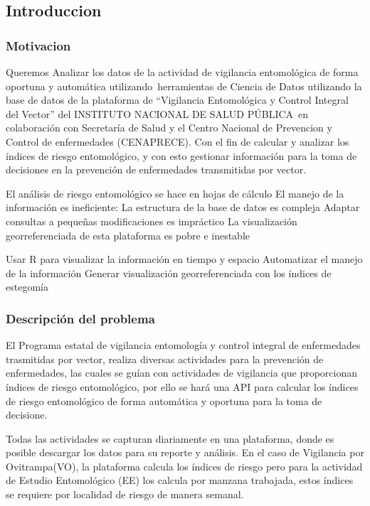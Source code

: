 \documentclass[
  letterpaper,
  DIV=11,
  numbers=noendperiod]{scrartcl}
\author{}
\date{}
\begin{document}
\subsection{Introduccion}\label{introduccion}

\subsubsection{Motivacion}\label{motivacion}

Queremos Analizar los datos de la actividad de vigilancia entomológica
de forma oportuna y automática utilizando~herramientas de Ciencia de
Datos utilizando la base de datos de la plataforma de ``Vigilancia
Entomológica y Control Integral del Vector'' del INSTITUTO NACIONAL DE
SALUD PÚBLICA~en colaboración con Secretaría de Salud y el Centro
Nacional de Prevencion y Control de enfermedades (CENAPRECE). Con el fin
de calcular y analizar los índices de riesgo entomológico, y con esto
gestionar información para la toma de decisiones en la prevención de
enfermedades transmitidas por vector.

El análisis de riesgo entomológico se hace en hojas de cálculo El manejo
de la información es ineficiente: La estructura de la base de datos es
compleja Adaptar consultas a pequeñas modificaciones es impráctico La
visualización georreferenciada de esta plataforma es pobre e inestable

Usar R para visualizar la información en tiempo y espacio Automatizar el
manejo de la información Generar visualización georreferenciada con los
índices de estegomía

\subsubsection{Descripción del
problema}\label{descripciuxf3n-del-problema}

El Programa estatal de vigilancia entomología y control integral de
enfermedades trasmitidas por vector, realiza diversas actividades para
la prevención de enfermedades, las cuales se guían con actividades de
vigilancia que proporcionan índices de riesgo entomológico, por ello se
hará una API para calcular los índices de riesgo entomológico de forma
automática y oportuna para la toma de decisione.

Todas las actividades se capturan diariamente en una plataforma, donde
es posible descargar los datos para su reporte y análisis. En el caso de
Vigilancia por Ovitrampa(VO), la plataforma calcula los índices de
riesgo pero para la actividad de Estudio Entomológico (EE) los calcula
por manzana trabajada, estos índices se requiere por localidad de riesgo
de manera semanal.
\end{document}
